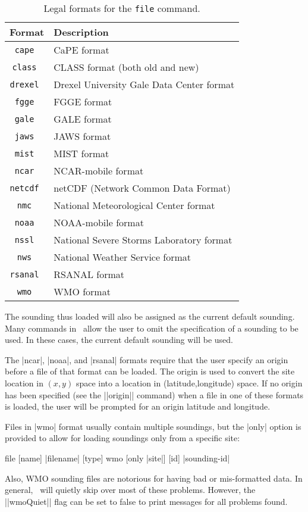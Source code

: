 \begin{table}[tp]
	\begin{center}
	\begin{tabular}{|c|l|}
		\hline
		Format		& Description \\
		\hline \hline
		\tt cape	& CaPE format \\
		\tt class	& CLASS format (both old and new) \\
                \tt drexel      & Drexel University Gale Data Center format \\
		\tt fgge	& FGGE format \\
		\tt gale	& GALE format \\
		\tt jaws	& JAWS format \\
		\tt mist	& MIST format \\
		\tt ncar	& NCAR-mobile format \\
		\tt netcdf	& netCDF (Network Common Data Format) \\
		\tt nmc		& National Meteorological Center format \\
		\tt noaa	& NOAA-mobile format \\
		\tt nssl	& National Severe Storms Laboratory format \\
		\tt nws		& National Weather Service format\\
		\tt rsanal	& RSANAL format \\
                \tt wmo		& WMO format \\ \hline
	\end{tabular}
	\end{center}
	\caption{Legal formats for the {\tt file} command.}
	\label{tbl-formats}
\end{table}

The sounding thus loaded will also be assigned as the current
default sounding.  Many commands in \suds\ allow the user to omit the 
specification of a sounding to be used.  In these cases, the current default
sounding will be used.

The |ncar|, |noaa|, and |rsanal| formats require that the user specify an
origin before a file of that format can be loaded.  The origin is used to
convert the site location in $(x,y)$ space into a location in
(latitude,longitude) space.  If no origin has been specified (see the
||origin|| command) when a file in one of these formats is loaded, the user 
will be prompted for an origin latitude and longitude.

Files in |wmo| format usually contain multiple soundings, but the |only|
option is provided to allow for loading soundings only from a specific site:
\begin{example}
	file [name] |filename| [type] wmo [only |site|] [id] |sounding-id|
\end{example}
Also, WMO sounding files are notorious for having bad or mis-formatted
data.  In general, \suds\ will quietly skip over most of these problems.
However, the ||wmoQuiet|| flag can be set to false to print messages for
all problems found.

